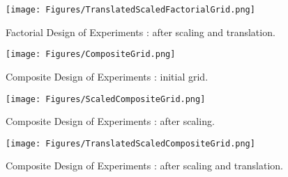              \begin{figure}[H]
               \begin{center}
                 \texttt{[image: Figures/TranslatedScaledFactorialGrid.png]}
               \end{center}
               \caption{Factorial Design of Experiments  : after scaling and translation.}
               \label{TranslatedScaledFactorialGrid}
             \end{figure}





             \begin{figure}[H]
               \begin{minipage}{10cm}
                 \begin{center}
                   \texttt{[image: Figures/CompositeGrid.png]}
                   \caption{Composite Design of Experiments  : initial grid.}
                   \label{CompositeGrid}
                 \end{center}
               \end{minipage}
               \hfill
               \begin{minipage}{10cm}
                 \begin{center}
                   \texttt{[image: Figures/ScaledCompositeGrid.png]}
                   \caption{Composite Design of Experiments  : after scaling.}
                   \label{ScaledCompositeGrid}
                 \end{center}
               \end{minipage}
             \end{figure}

             \begin{figure}[H]
               \begin{center}
                 \texttt{[image: Figures/TranslatedScaledCompositeGrid.png]}
               \end{center}
               \caption{Composite Design of Experiments  : after scaling and translation.}
               \label{TranslatedScaledCompositeGrid}
             \end{figure}


